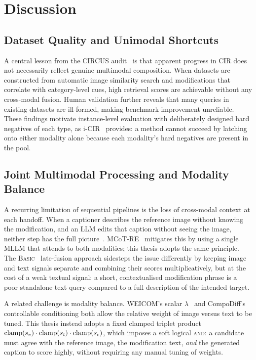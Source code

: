 \section{Discussion}\label{sect:rel_discussion}

\subsection{Dataset Quality and Unimodal Shortcuts}\label{sect:rel_disc_datasets}

A central lesson from the CIRCUS audit~\cite{attimonelli2026circus} is that
apparent progress in CIR does not necessarily reflect genuine multimodal
composition. When datasets are constructed from automatic image similarity
search and modifications that correlate with category-level cues, high retrieval
scores are achievable without any cross-modal fusion. Human validation further
reveals that many queries in existing datasets are ill-formed, making benchmark
improvement unreliable. These findings motivate instance-level evaluation with
deliberately designed hard negatives of each type, as i-CIR~\cite{psomas2025icir}
provides: a method cannot succeed by latching onto either modality alone because
each modality's hard negatives are present in the pool.

\subsection{Joint Multimodal Processing and Modality Balance}\label{sect:rel_disc_joint}

A recurring limitation of sequential pipelines is the loss of cross-modal
context at each handoff. When a captioner describes the reference image without
knowing the modification, and an LLM edits that caption without seeing the
image, neither step has the full picture~\cite{karthik2024cirevl}. MCoT-RE~\cite{park2025mcot}
mitigates this by using a single MLLM that attends to both modalities; this
thesis adopts the same principle. The \textsc{Basic}~\cite{psomas2025icir}
late-fusion approach sidesteps the issue differently by keeping image and text
signals separate and combining their scores multiplicatively, but at the cost of
a weak textual signal: a short, contextualised modification phrase is a poor
standalone text query compared to a full description of the intended target.

A related challenge is modality balance. WEICOM's scalar
$\lambda$~\cite{psomas2024rscir} and CompoDiff's~\cite{gu2024compodiff}
controllable conditioning both allow the relative weight of image versus text to
be tuned. This thesis instead adopts a fixed clamped triplet product
$\mathrm{clamp}(s_{v})\cdot\mathrm{clamp}(s_{t})\cdot\mathrm{clamp}(s_{c})$, which imposes a soft logical
\textsc{and}: a candidate must agree with the reference image, the modification
text, \emph{and} the generated caption to score highly, without requiring any
manual tuning of weights.

